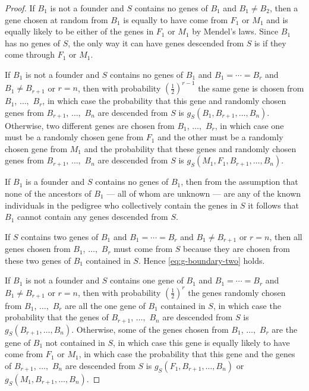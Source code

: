 \documentclass[11pt]{article}
\begin{document}
\begin{proof}
If $B_1$ is not a founder and $S$ contains no genes of $B_1$
and $B_1 \neq B_2$, then a gene chosen at random from $B_1$ is equally
to have come from $F_1$ or $M_1$ and is equally likely to be either of
the genes in $F_1$ or $M_1$ by Mendel's laws.  Since $B_1$ has no genes
of $S$, the only way it can have genes descended from $S$ is if they
come through $F_1$ or $M_1$.

If $B_1$ is not a founder and $S$ contains no genes of $B_1$
and $B_1 = \cdots = B_r$ and $B_1 \neq B_{r + 1}$ or $r = n$, then
with probability $(\tfrac{1}{2})^{r - 1}$ the same gene is chosen from
$B_1$, $\ldots,$ $B_r$, in which case the probability that this gene
and randomly chosen genes from $B_{r + 1}$, $\ldots,$ $B_n$ are descended
from $S$ is $g_S(B_1, B_{r + 1}, \ldots, B_n)$.  Otherwise, two different
genes are chosen from $B_1$, $\ldots,$ $B_r$, in which case one must be
a randomly chosen gene from $F_1$ and the other must be
a randomly chosen gene from $M_1$ and the probability that these genes
and randomly chosen genes from $B_{r + 1}$, $\ldots,$ $B_n$ are descended
from $S$ is $g_S(M_1, F_1, B_{r + 1}, \ldots, B_n)$.

If $B_1$ is a founder and $S$ contains no genes of $B_1$, then
from the assumption that none of the ancestors of $B_1$ --- all of whom
are unknown ---
are any of the known individuals in the pedigree who collectively contain
the genes in $S$ it follows that $B_1$ cannot contain any genes descended
from $S$.

If $S$ contains two genes of $B_1$
and $B_1 = \cdots = B_r$ and $B_1 \neq B_{r + 1}$ or $r = n$, then
all genes chosen from $B_1$, $\ldots,$ $B_r$ must come from $S$ because
they are chosen from these two genes of $B_1$ contained in $S$.
Hence \eqref{eq:g-boundary-two} holds.

If $B_1$ is not a founder and $S$ contains one gene of $B_1$
and $B_1 = \cdots = B_r$ and $B_1 \neq B_{r + 1}$ or $r = n$, then
with probability $(\tfrac{1}{2})^r$ the genes randomly chosen from
$B_1$, $\ldots,$ $B_r$ are all the one gene of $B_1$ contained in $S$,
in which case the probability that the genes of $B_{r + 1}$, $\ldots,$ $B_n$
are descended from $S$ is $g_S(B_{r + 1}, \ldots, B_n)$.
Otherwise, some of the genes chosen from $B_1$, $\ldots,$ $B_r$ are the
gene of $B_1$ not contained in $S$, in which case this gene is equally
likely to have come from $F_1$ or $M_1$,
in which case the probability that this gene and
the genes of $B_{r + 1}$, $\ldots,$ $B_n$
are descended from $S$ is $g_S(F_1, B_{r + 1}, \ldots, B_n)$
or $g_S(M_1, B_{r + 1}, \ldots, B_n)$.


\end{proof}
\end{document}
